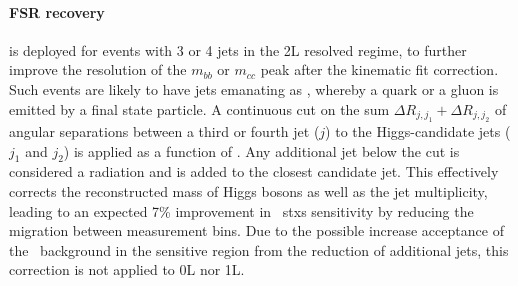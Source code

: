 \paragraph{FSR recovery} is deployed for events with 3 or 4 jets in the 2L resolved regime, to further improve the resolution of the $m_{bb}$ or $m_{cc}$ peak after the kinematic fit correction. Such events are likely to have jets emanating as , whereby a quark or a gluon is emitted by a final state particle. A continuous cut on the sum $\Delta R_{j, j_1} + \Delta R_{j, j_2}$ of angular separations between a third or fourth jet ($j$) to the Higgs-candidate jets ($j_1$ and $j_2$) is applied as a function of \ptv. Any additional jet below the cut is considered a radiation and is added to the closest candidate jet. This effectively corrects the reconstructed mass of Higgs bosons as well as the jet multiplicity, leading to an expected 7\% improvement in \vhb\ \gls{stxs} sensitivity by reducing the migration between measurement bins. Due to the possible increase acceptance of the \ttb\ background in the sensitive region from the reduction of additional jets, this correction is not applied to 0L nor 1L.

